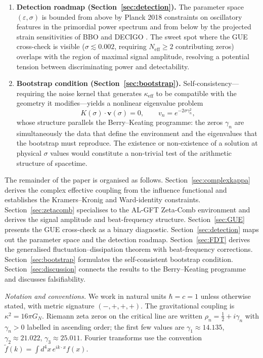 \documentclass[12pt,a4paper]{article}
\begin{document}
\begin{enumerate}
\item \textbf{Detection roadmap (Section~\ref{sec:detection}).}
  The parameter space $(\varepsilon,\sigma)$ is bounded from above by Planck 2018 constraints on oscillatory features in the primordial power spectrum \cite{Planck2018X} and from below by the projected strain sensitivities of BBO \cite{BBO2011} and DECIGO \cite{DECIGO2021}.
  The sweet spot where the GUE cross-check is visible ($\sigma\lesssim 0.002$, requiring $N_{\mathrm{eff}}\geq 2$ contributing zeros) overlaps with the region of maximal signal amplitude, resolving a potential tension between discriminating power and detectability.

\item \textbf{Bootstrap condition (Section~\ref{sec:bootstrap}).}
  Self-consistency---requiring the noise kernel that generates $\kappa_{\mathrm{eff}}$ to be compatible with the geometry it modifies---yields a nonlinear eigenvalue problem
  \begin{equation}\label{eq:bootstrap_intro}
    K(\sigma)\cdot\mathbf{v}(\sigma) = 0, \qquad v_{n}=e^{-2\sigma\gamma_{n}^{2}},
  \end{equation}
  whose structure parallels the Berry--Keating programme: the zeros $\gamma_{n}$ are simultaneously the data that define the environment and the eigenvalues that the bootstrap must reproduce.
  The existence or non-existence of a solution at physical $\sigma$ values would constitute a non-trivial test of the arithmetic structure of spacetime.
\end{enumerate}

\medskip

The remainder of the paper is organised as follows.
Section~\ref{sec:complexkappa} derives the complex effective coupling from the influence functional and establishes the Kramers--Kronig and Ward-identity constraints.
Section~\ref{sec:zetacomb} specialises to the AL-GFT Zeta-Comb environment and derives the signal amplitude and beat-frequency structure.
Section~\ref{sec:GUE} presents the GUE cross-check as a binary diagnostic.
Section~\ref{sec:detection} maps out the parameter space and the detection roadmap.
Section~\ref{sec:FDT} derives the generalised fluctuation--dissipation theorem with beat-frequency corrections.
Section~\ref{sec:bootstrap} formulates the self-consistent bootstrap condition.
Section~\ref{sec:discussion} connects the results to the Berry--Keating programme and discusses falsifiability.

\medskip

\noindent\textit{Notation and conventions.}
We work in natural units $\hbar=c=1$ unless otherwise stated, with metric signature $(-,+,+,+)$.
The gravitational coupling is $\kappa^{2}=16\pi G_{N}$.
Riemann zeta zeros on the critical line are written $\rho_{n}=\tfrac{1}{2}+i\gamma_{n}$ with $\gamma_{n}>0$ labelled in ascending order; the first few values are $\gamma_{1}\approx 14.135$, $\gamma_{2}\approx 21.022$, $\gamma_{3}\approx 25.011$.
Fourier transforms use the convention $\tilde{f}(k)=\int d^{4}x\,e^{ik\cdot x}f(x)$.
\end{document}
